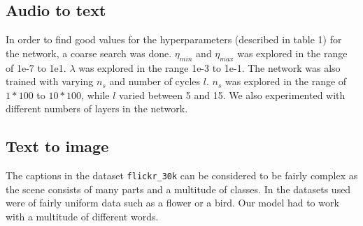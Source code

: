 \documentclass[../main.tex]{subfiles}
\begin{document}
\subsection{Audio to text}
In order to find good values for the hyperparameters (described in table 1) for the network, a coarse search was done.  $\eta_{min}$ and   $\eta_{max}$ was explored in the range of 1e-7 to 1e1. $\lambda$ was explored in the range 1e-3 to 1e-1. The network was also trained with varying $n_s$ and number of cycles $l$. $n_s$ was explored in the range of $1*100$ to $10*100$, while $l$ varied between 5 and 15. We also experimented with different numbers of layers in the network.
\subsection{Text to image}
The captions in the dataset \texttt{flickr\_30k} can be considered to be fairly complex as the scene consists of many parts and a multitude of classes. In \cite{reed2016generative} the datasets used were of fairly uniform data such as a flower or a bird. Our model had to work with a multitude of different words. 
\end{document}
